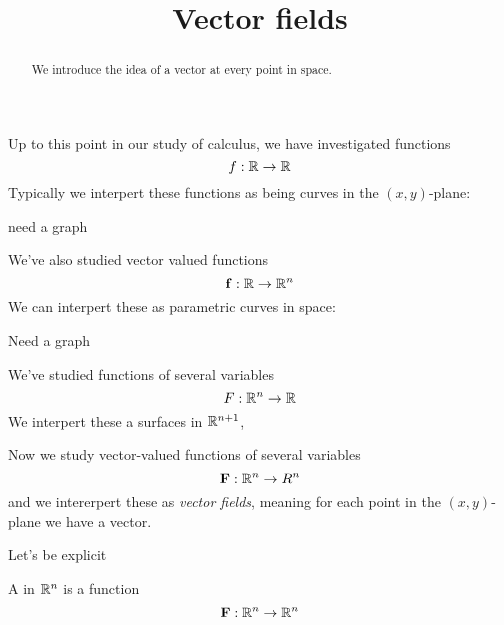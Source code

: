 \documentclass{ximera}
\title[Dig-In:]{Vector fields}
\begin{document}
\begin{abstract}
  We introduce the idea of a vector at every point in space. 
\end{abstract}
\maketitle

Up to this point in our study of calculus, we have investigated functions
\[
f:\mathbb R \to \mathbb R
\]
Typically we interpert these functions as being curves in the $(x,y)$-plane:
\begin{image}
  need a graph
\end{image}
We've also studied vector valued functions
\[
\mathbf{f}:\mathbb R \to \mathbb R^n
\]
We can interpert these as parametric curves in space:
\begin{image}
  Need a graph
\end{image}

We've studied functions of several variables
\[
F:\mathbb R^n \to \mathbb R
\]
We interpert these a surfaces in $\mathbb R^{n+1}$,


Now we study vector-valued functions of several variables
\[
\mathbf{F}:\mathbb R^n\to R^n
\]
and we intererpert these as \textit{vector fields}, meaning for each
point in the $(x,y)$-plane we have a vector.
\begin{image}
\end{image}

Let's be explicit
\begin{definiiton}
  A  in $\mathbb R^n$ is a function
  \[
  \mathbf{F}: \mathbb R^n\to\mathbb R^n
  \]
\end{definiiton}
\end{document}
